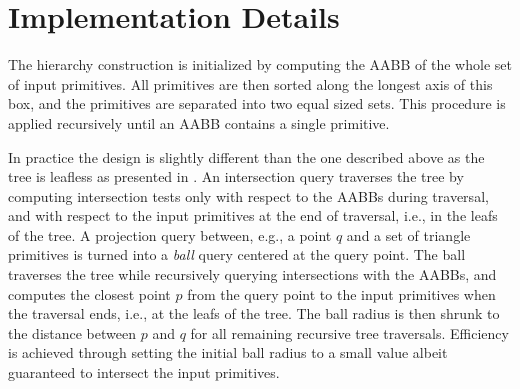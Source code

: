 \section{Implementation Details}
\label{AABB_tree_section_details}

The hierarchy construction is initialized by computing the AABB of the whole set of input primitives. All primitives are then sorted along the longest axis of this box, and the primitives are separated into two equal sized sets. This procedure is applied recursively until an AABB contains a single primitive. 

In practice the design is slightly different than the one described above as the tree is leafless as presented in  \cite{cgal:t-ocdl-05}. An intersection query traverses the tree by computing intersection tests only with respect to the AABBs during traversal, and with respect to the input primitives at the end of traversal, i.e., in the leafs of the tree. A projection query between, e.g., a point $q$ and a set of triangle primitives is turned into a \emph{ball} query centered at the query point. The ball traverses the tree while recursively querying intersections with the AABBs, and computes the closest point $p$ from the query point to the input primitives when the traversal ends, i.e., at the leafs of the tree. The ball radius is then shrunk to the distance between $p$ and $q$ for all remaining recursive tree traversals. Efficiency is achieved through setting the initial ball radius to a small value albeit guaranteed to intersect the input primitives.
